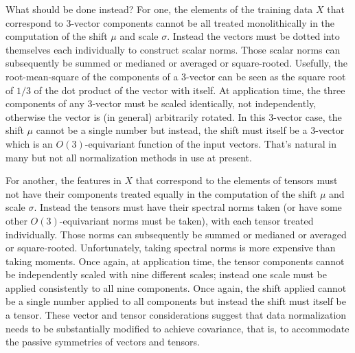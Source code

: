 \documentclass[preprint]{article} %
\begin{document}
What should be done instead?
For one, the elements of the training data $X$ that correspond to 3-vector components cannot be all treated monolithically in the computation of the shift $\mu$ and scale $\sigma$.
Instead the vectors must be dotted into themselves each individually to construct scalar norms.
Those scalar norms can subsequently be summed or medianed or averaged or square-rooted.
Usefully, the root-mean-square of the components of a 3-vector can be seen as the square root of $1/3$ of the dot product of the vector with itself.
At application time, the three components of any 3-vector must be scaled identically, not independently, otherwise the vector is (in general) arbitrarily rotated.
In this 3-vector case, the shift $\mu$ cannot be a single number but instead, the shift must itself be a 3-vector which is an $O(3)$-equivariant function of the input vectors.
That's natural in many but not all normalization methods in use at present.

For another, the features in $X$ that correspond to the elements of tensors must not have their components treated equally in the computation of the shift $\mu$ and scale $\sigma$.
Instead the tensors must have their spectral norms taken (or have some other $O(3)$-equivariant norms must be taken), with each tensor treated individually.
Those norms can subsequently be summed or medianed or averaged or square-rooted.
Unfortunately, taking spectral norms is more expensive than taking moments.
Once again, at application time, the tensor components cannot be independently scaled with nine different scales; instead one scale must be applied consistently to all nine components.
Once again, the shift applied cannot be a single number applied to all components but instead the shift must itself be a tensor.
These vector and tensor considerations suggest that data normalization needs to be substantially modified to achieve covariance, that is, to accommodate the passive symmetries of vectors and tensors.
\end{document}
